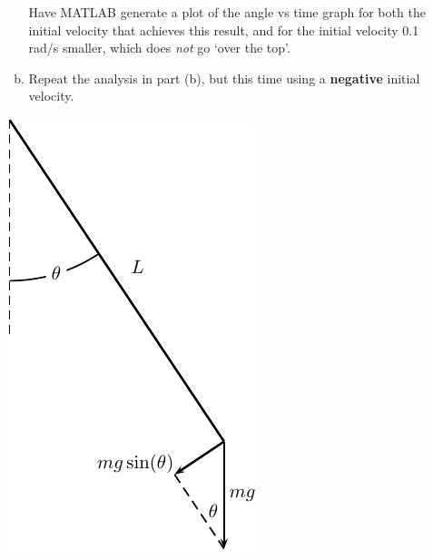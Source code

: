 \begin{enumerate}[1.]
\begin{Question}
\begin{minipage}[t]{0.7\linewidth}
\begin{enumerate}[(a)]
  Have MATLAB generate a plot of the angle vs time graph for both the
  initial velocity that achieves this result, and for the initial velocity 0.1 rad/s smaller, which does {\em not} go `over the top'.
\item Repeat the analysis in part (b), but this time using a {\bf
    negative} initial velocity.
\end{enumerate}
\end{minipage} \hfill
\begin{minipage}[t]{0.25\linewidth}
\vspace{0pt}
  \includegraphics[width=1.0\linewidth]{graphics/Week09_Pendulum/pendulum_diagram}
\end{minipage}




\end{Question}
\end{enumerate}
